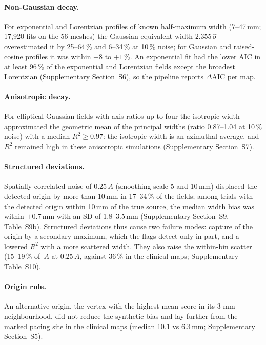 \documentclass[a4paper,fleqn]{cas-dc}
\begin{document}
\paragraph{Non-Gaussian decay.}
For exponential and Lorentzian profiles of known half-maximum
width (7--47\,mm; 17{,}920 fits on the 56 meshes) the Gaussian-equivalent
width $2.355\,\hat\sigma$ overestimated it by 25--64\,\% and 6--34\,\% at
10\,\% noise; for Gaussian and raised-cosine profiles it was within $-8$
to $+1$\,\%.  An exponential fit had the lower AIC in at least 96\,\% of
the exponential and Lorentzian fields except the broadest Lorentzian
(Supplementary Section~S6), so the pipeline reports
$\Delta\mathrm{AIC}$ per map.
\paragraph{Anisotropic decay.}
For elliptical Gaussian fields with axis ratios up to four the isotropic
width approximated the geometric mean of the principal widths (ratio
0.87--1.04 at 10\,\% noise) with a median $R^2 \ge 0.97$: the isotropic
width is an azimuthal average, and $R^2$ remained high in these
anisotropic simulations
(Supplementary Section~S7).
\paragraph{Structured deviations.}
Spatially correlated noise of 0.25\,$A$ (smoothing scale 5 and 10\,mm)
displaced the detected origin by more than 10\,mm in 17--34\,\% of the
fields; among trials with the detected origin within 10\,mm of the true
source, the median width bias was within $\pm 0.7$\,mm with an SD of
1.8--3.5\,mm (Supplementary
Section~S9, Table~S9b).  Structured deviations thus cause two failure
modes: capture of the origin by a secondary maximum, which the flags
detect only in part, and a lowered $R^2$ with a more scattered width.
They also raise the within-bin scatter (15--19\,\% of~$A$ at 0.25\,$A$,
against 36\,\% in the clinical maps; Supplementary Table~S10).
\paragraph{Origin rule.}
An alternative origin, the vertex with the highest mean score in its
3-mm neighbourhood, did not reduce the synthetic bias and lay further
from the marked pacing site in the clinical maps (median 10.1 vs
6.3\,mm; Supplementary Section~S5).
\end{document}
